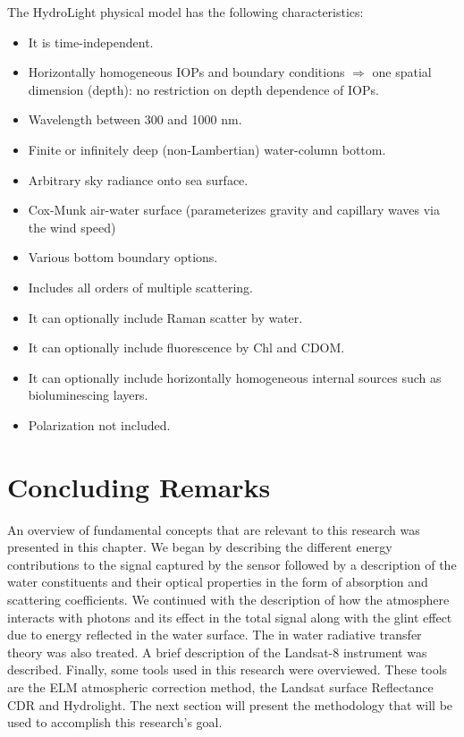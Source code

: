 The HydroLight physical model has the following characteristics:

\begin{itemize}
	\item It is time-independent.
	\item Horizontally homogeneous IOPs and boundary conditions $\Rightarrow$ one spatial dimension (depth): no restriction on depth dependence of IOPs.
	\item Wavelength between 300 and 1000 nm.
	\item Finite or infinitely deep (non-Lambertian) water-column bottom.
	\item Arbitrary sky radiance onto sea surface.
	\item Cox-Munk air-water surface (parameterizes gravity and capillary waves via the wind speed)
	\item Various bottom boundary options.
	\item Includes all orders of multiple scattering.
	\item It can optionally include Raman scatter by water.
	\item It can optionally include fluorescence by Chl and CDOM.
	\item It can optionally include horizontally homogeneous internal sources such as bioluminescing layers.
	\item Polarization not included.
\end{itemize}




\section{Concluding Remarks}
An overview of fundamental concepts that are relevant to this research was presented in this chapter. We began by describing the different energy contributions to the signal captured by the sensor followed by a description of the water constituents and their optical properties in the form of absorption and scattering coefficients. We continued with the description of how the atmosphere interacts with photons and its effect in the total signal along with the glint effect due to energy reflected in the water surface. The in water radiative transfer theory was also treated. A brief description of the Landsat-8 instrument was described. Finally, some tools used in this research were overviewed. These tools are the ELM atmospheric correction method, the Landsat surface Reflectance CDR and Hydrolight. The next section will present the methodology that will be used to accomplish this research's goal.
